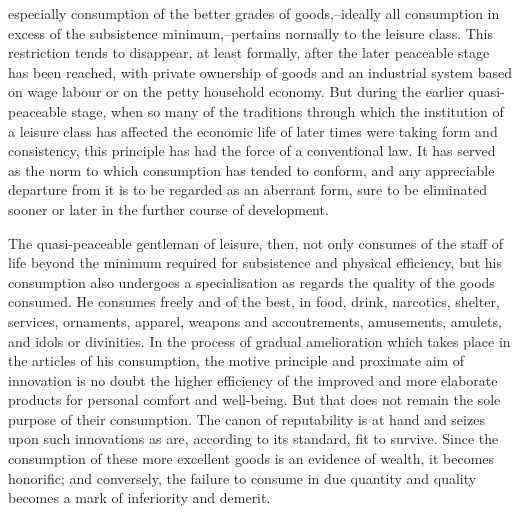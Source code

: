 \documentclass[12pt]{report}
\begin{document}
especially consumption of the better grades of goods,--ideally all
consumption in excess of the subsistence minimum,--pertains normally
to the leisure class. This restriction tends to disappear, at least
formally, after the later peaceable stage has been reached, with private
ownership of goods and an industrial system based on wage labour or
on the petty household economy. But during the earlier quasi-peaceable
stage, when so many of the traditions through which the institution of a
leisure class has affected the economic life of later times were taking
form and consistency, this principle has had the force of a conventional
law. It has served as the norm to which consumption has tended to
conform, and any appreciable departure from it is to be regarded as
an aberrant form, sure to be eliminated sooner or later in the further
course of development.

The quasi-peaceable gentleman of leisure, then, not only consumes of the
staff of life beyond the minimum required for subsistence and physical
efficiency, but his consumption also undergoes a specialisation as
regards the quality of the goods consumed. He consumes freely and of the
best, in food, drink, narcotics, shelter, services, ornaments, apparel,
weapons and accoutrements, amusements, amulets, and idols or divinities.
In the process of gradual amelioration which takes place in the articles
of his consumption, the motive principle and proximate aim of innovation
is no doubt the higher efficiency of the improved and more elaborate
products for personal comfort and well-being. But that does not remain
the sole purpose of their consumption. The canon of reputability is at
hand and seizes upon such innovations as are, according to its standard,
fit to survive. Since the consumption of these more excellent goods is
an evidence of wealth, it becomes honorific; and conversely, the failure
to consume in due quantity and quality becomes a mark of inferiority and
demerit.
\end{document}
